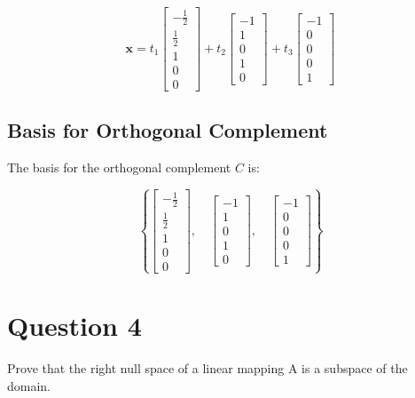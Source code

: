 \documentclass{article}
\begin{document}
\[
\mathbf{x} = t_1 \begin{bmatrix} -\frac{1}{2} \\ \frac{1}{2} \\ 1 \\ 0 \\ 0 \end{bmatrix} + t_2 \begin{bmatrix} -1 \\ 1 \\ 0 \\ 1 \\ 0 \end{bmatrix} + t_3 \begin{bmatrix} -1 \\ 0 \\ 0 \\ 0 \\ 1 \end{bmatrix}
\]

\subsection{Basis for Orthogonal Complement}

The basis for the orthogonal complement \( C \) is:

\[
\left\{ 
    \begin{bmatrix} -\frac{1}{2} \\ \frac{1}{2} \\ 1 \\ 0 \\ 0 \end{bmatrix}, \quad
    \begin{bmatrix} -1 \\ 1 \\ 0 \\ 1 \\ 0 \end{bmatrix}, \quad
    \begin{bmatrix} -1 \\ 0 \\ 0 \\ 0 \\ 1 \end{bmatrix}
\right\}
\]

\section{Question 4}

Prove that the right null space of a linear mapping A is a subspace of the domain.
\end{document}
